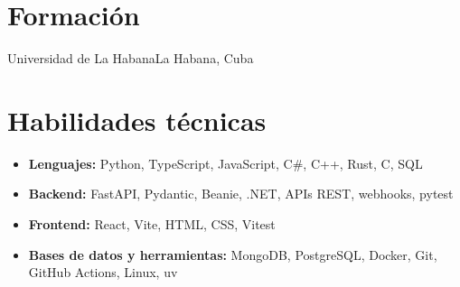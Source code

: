 \documentclass[es]{resume}
\begin{document}
\section{Formación}
\begin{entries}
              {Universidad de La Habana}{La Habana, Cuba}
  \begin{bullets}
  \end{bullets}
\end{entries}

\section{Habilidades técnicas}
\begin{itemize}[leftmargin=0.1in, label={}, itemsep=0pt]
  \small
  \item \textbf{Lenguajes:} Python, TypeScript, JavaScript, C\#, C++, Rust, C, SQL
  \item \textbf{Backend:} FastAPI, Pydantic, Beanie, .NET, APIs REST, webhooks, pytest
  \item \textbf{Frontend:} React, Vite, HTML, CSS, Vitest
  \item \textbf{Bases de datos y herramientas:} MongoDB, PostgreSQL, Docker, Git, GitHub Actions, Linux, uv
\end{itemize}
\end{document}
